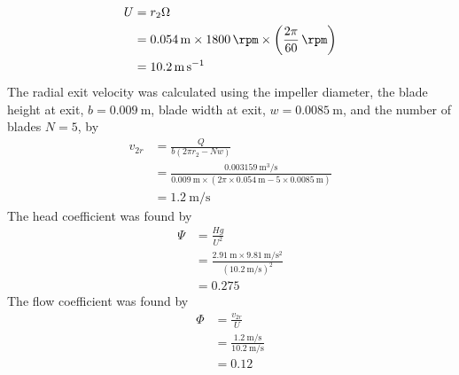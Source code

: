 \begin{align*}
    U &= r_2 \Omega \\
    &= \qty{0.054}{\meter} \times \qty{1800}{\rpm} \times \left(\frac{2\pi}{60}\,\unit{\per\rpm}\right) \\
    &= \qty{10.2}{\meter\per\second}
\end{align*}
The radial exit velocity was calculated using the impeller diameter, the blade height at exit, $b = \qty{0.009}{\meter}$, blade width at exit, $w = \qty{0.0085}{\meter}$, and the number of blades $N=5$, by
\begin{align*}
    v_{2r} &= \frac{Q}{b(2\pi r_2 - Nw)} \\
    &= \frac{\qty{0.003159}{\meter\cubed\per\second}}{\qty{0.009}{\meter} \times (2\pi \times \qty{0.054}{\meter} - 5 \times \qty{0.0085}{\meter})} \\
    &= \qty{1.2}{\meter\per\second}
\end{align*}
The head coefficient was found by
\begin{align*}
    \Psi &= \frac{Hg}{U^2} \\
    &= \frac{\qty{2.91}{\meter} \times \qty{9.81}{\meter\per\second\squared}}{(\qty{10.2}{\meter\per\second})^2} \\
    &= 0.275
\end{align*}
The flow coefficient was found by
\begin{align*}
    \Phi &= \frac{v_{2r}}{U} \\
    &= \frac{\qty{1.2}{\meter\per\second}}{\qty{10.2}{\meter\per\second}} \\
    &= 0.12
\end{align*}

